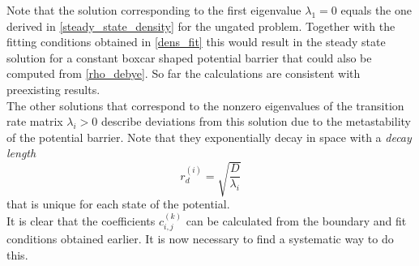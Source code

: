 Note that the solution corresponding to the first eigenvalue $\lambda_1 = 0$ equals the one derived in \eqref{steady_state_density} for the ungated problem. Together with the fitting conditions obtained in \eqref{dens_fit} this would result in the steady state solution for a constant boxcar shaped potential barrier that could also be computed from \eqref{rho_debye}. So far the calculations are consistent with preexisting results. \\
The other solutions that correspond to the nonzero eigenvalues of the transition rate matrix $\lambda_i>0$ describe deviations from this solution due to the metastability of the potential barrier. Note that they exponentially decay in space with a \textit{decay length}
\begin{equation}
    \boxed{r_d^{(i)} = \sqrt{\frac{D}{\lambda_i}}}
    \label{decay_length}
\end{equation}
that is unique for each state of the potential. \\
It is clear that the coefficients $c^{(k)}_{i,j}$ can be calculated from the boundary and fit conditions obtained earlier. It is now necessary to find a systematic way to do this.

